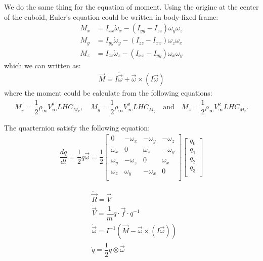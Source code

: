 \documentclass[12pt, a4paper]{article}
\begin{document}
We do the same thing for the equation of moment. Using the origine at the center of the cuboid, Euler's equation could be written in body-fixed frame:
\begin{align}
	M_x & = I_{xx}\dot{\omega}_x - (I_{yy} - I_{zz})\omega_y \omega_z \\
	M_y & = I_{yy}\dot{\omega}_y - (I_{zz} - I_{xx})\omega_z \omega_x \\
	M_z & = I_{zz}\dot{\omega}_z - (I_{xx} - I_{yy})\omega_x \omega_y
\end{align}
which we can written as:
\begin{align}
	\vec{M} = I \dot{\vec{\omega}} + \vec{\omega} \times (I \vec{\omega})
\end{align}
where the moment could be calculate from the following equations:
\begin{align}
	M_x = \dfrac{1}{2} \rho_\infty V_\infty^2 LH C_{M_x}, \quad M_y = \dfrac{1}{2} \rho_\infty V_\infty^2 LH C_{M_y} \quad \text{and} \quad M_z = \dfrac{1}{2} \rho_\infty V_\infty^2 LH C_{M_z}.
\end{align}

The quarternion satisfy the following equation:
\begin{align}
	\dfrac{dq}{dt} = \dfrac{1}{2} q \vec{\omega} = \dfrac{1}{2}
	\begin{bmatrix}
		0 & -\omega_x & -\omega_y & -\omega_z \\
		\omega_x & 0 & \omega_z & -\omega_y \\
		\omega_y & -\omega_z & 0 & \omega_x \\
		\omega_z & \omega_y & -\omega_x & 0 \\
	\end{bmatrix}\begin{bmatrix}
		q_0 \\
		q_1 \\
		q_2 \\
		q_3 \\
	\end{bmatrix}
\end{align}


\begin{equation}
	\boxed{
	\begin{aligned}
		& \dot{\vec{R}} = \vec{V} \\
		& \dot{\vec{V}} = \dfrac{1}{m} q \cdot \vec{f} \cdot q^{-1} \\
		& \dot{\vec{\omega}} = I^{-1} \left(\vec{M} - \vec{\omega} \times (I \vec{\omega}) \right) \\
		& \dot{q} = \dfrac{1}{2} q \otimes \vec{\omega}
	\end{aligned}}
\end{equation}
\end{document}
